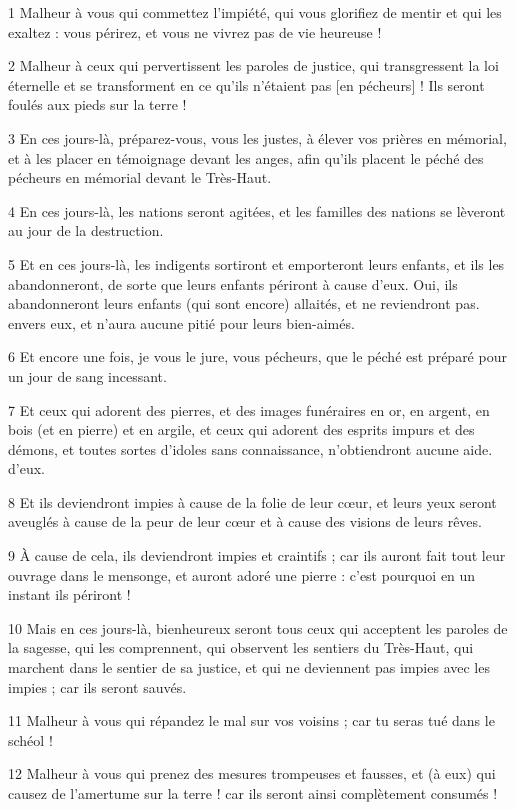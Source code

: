 \par 1 Malheur à vous qui commettez l'impiété, qui vous glorifiez de mentir et qui les exaltez : vous périrez, et vous ne vivrez pas de vie heureuse !
\par 2 Malheur à ceux qui pervertissent les paroles de justice, qui transgressent la loi éternelle et se transforment en ce qu'ils n'étaient pas [en pécheurs] ! Ils seront foulés aux pieds sur la terre !
\par 3 En ces jours-là, préparez-vous, vous les justes, à élever vos prières en mémorial, et à les placer en témoignage devant les anges, afin qu'ils placent le péché des pécheurs en mémorial devant le Très-Haut.
\par 4 En ces jours-là, les nations seront agitées, et les familles des nations se lèveront au jour de la destruction.
\par 5 Et en ces jours-là, les indigents sortiront et emporteront leurs enfants, et ils les abandonneront, de sorte que leurs enfants périront à cause d'eux. Oui, ils abandonneront leurs enfants (qui sont encore) allaités, et ne reviendront pas. envers eux, et n'aura aucune pitié pour leurs bien-aimés.
\par 6 Et encore une fois, je vous le jure, vous pécheurs, que le péché est préparé pour un jour de sang incessant.
\par 7 Et ceux qui adorent des pierres, et des images funéraires en or, en argent, en bois (et en pierre) et en argile, et ceux qui adorent des esprits impurs et des démons, et toutes sortes d'idoles sans connaissance, n'obtiendront aucune aide. d'eux.
\par 8 Et ils deviendront impies à cause de la folie de leur cœur, et leurs yeux seront aveuglés à cause de la peur de leur cœur et à cause des visions de leurs rêves.
\par 9 À cause de cela, ils deviendront impies et craintifs ; car ils auront fait tout leur ouvrage dans le mensonge, et auront adoré une pierre : c'est pourquoi en un instant ils périront !
\par 10 Mais en ces jours-là, bienheureux seront tous ceux qui acceptent les paroles de la sagesse, qui les comprennent, qui observent les sentiers du Très-Haut, qui marchent dans le sentier de sa justice, et qui ne deviennent pas impies avec les impies ; car ils seront sauvés.
\par 11 Malheur à vous qui répandez le mal sur vos voisins ; car tu seras tué dans le schéol !
\par 12 Malheur à vous qui prenez des mesures trompeuses et fausses, et (à eux) qui causez de l'amertume sur la terre ! car ils seront ainsi complètement consumés !
